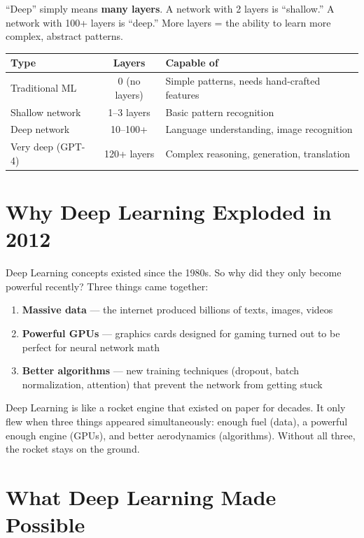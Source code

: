 \documentclass[11pt,a4paper]{report}
\begin{document}
``Deep'' simply means \textbf{many layers}. A network with 2 layers is ``shallow.'' A network with 100+ layers is ``deep.'' More layers = the ability to learn more complex, abstract patterns.

\begin{table}[h]
\centering
\begin{tabularx}{\textwidth}{l c X}
\toprule
\textbf{Type} & \textbf{Layers} & \textbf{Capable of} \\
\midrule
Traditional ML & 0 (no layers) & Simple patterns, needs hand-crafted features \\
Shallow network & 1--3 layers & Basic pattern recognition \\
Deep network & 10--100+ & Language understanding, image recognition \\
Very deep (GPT-4) & 120+ layers & Complex reasoning, generation, translation \\
\bottomrule
\end{tabularx}
\end{table}

\section{Why Deep Learning Exploded in 2012}

Deep Learning concepts existed since the 1980s. So why did they only become powerful recently? Three things came together:

\begin{enumerate}
    \item \textbf{Massive data} --- the internet produced billions of texts, images, videos
    \item \textbf{Powerful GPUs} --- graphics cards designed for gaming turned out to be perfect for neural network math
    \item \textbf{Better algorithms} --- new training techniques (dropout, batch normalization, attention) that prevent the network from getting stuck
\end{enumerate}

\begin{analogybox}
Deep Learning is like a rocket engine that existed on paper for decades. It only flew when three things appeared simultaneously: enough fuel (data), a powerful enough engine (GPUs), and better aerodynamics (algorithms). Without all three, the rocket stays on the ground.
\end{analogybox}

\section{What Deep Learning Made Possible}
\end{document}
